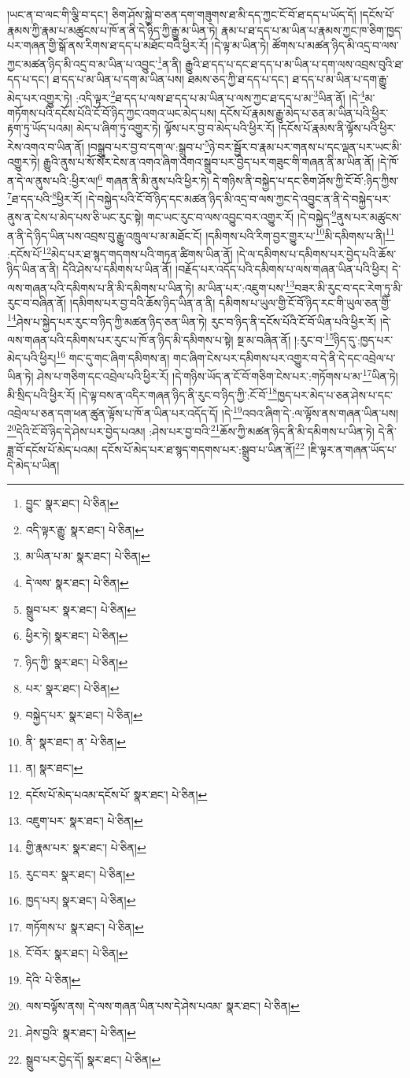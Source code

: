 །ཡང་ན་བ་ལང་གི་ལྕི་བ་དང་། ཅིག་ཤོས་སྐྱེ་བ་ཅན་དག་གཟུགས་ཐ་མི་དད་ཀྱང་ངོ་བོ་ཐ་དད་པ་ཡོད་དོ། །དངོས་པོ་རྣམས་ཀྱི་རྣམ་པ་མཚུངས་པ་ཁོ་ན་ནི་དེ་ཉིད་ཀྱི་རྒྱུ་མ་ཡིན་ཏེ། རྣམ་པ་ཐ་དད་པ་མ་ཡིན་པ་རྣམས་ཀྱང་ཁ་ཅིག་ཁྱད་པར་གཞན་གྱི་སྒོ་ནས་རིགས་ཐ་དད་པ་མཐོང་བའི་ཕྱིར་རོ། །དེ་ལྟ་མ་ཡིན་ཏེ། ཚོགས་པ་མཚན་ཉིད་མི་འདྲ་བ་ལས་ཀྱང་མཚན་ཉིད་མི་འདྲ་བ་མ་ཡིན་པ་འབྱུང་\footnote{བྱུང་  སྣར་ཐང་།  པེ་ཅིན། }ན་ནི། རྒྱུའི་ཐ་དད་པ་དང་ཐ་དད་པ་མ་ཡིན་པ་དག་ལས་འབྲས་བུའི་ཐ་དད་པ་དང་། ཐ་དད་པ་མ་ཡིན་པ་དག་མ་ཡིན་པས། ཐམས་ཅད་ཀྱི་ཐ་དད་པ་དང་། ཐ་དད་པ་མ་ཡིན་པ་དག་རྒྱུ་མེད་པར་འགྱུར་ཏེ། :འདི་ལྟར་\footnote{འདི་ལྟར་རྒྱུ་  སྣར་ཐང་།  པེ་ཅིན། }ཐ་དད་པ་ལས་ཐ་དད་པ་མ་ཡིན་པ་ལས་ཀྱང་ཐ་དད་པ་མ་\footnote{མ་ཡིན་པ་མ་  སྣར་ཐང་།  པེ་ཅིན། }ཡིན་ནོ། །དེ་\footnote{དེ་ལས་  སྣར་ཐང་།  པེ་ཅིན། }མ་གཏོགས་པའི་དངོས་པོའི་ངོ་བོ་ཉིད་ཀྱང་འགའ་ཡང་མེད་པས། དངོས་པོ་རྣམས་རྒྱུ་མེད་པ་ཅན་མ་ཡིན་པའི་ཕྱིར་རྟག་ཏུ་ཡོད་པའམ། མེད་པ་ཞིག་ཏུ་འགྱུར་ཏེ། ལྟོས་པར་བྱ་བ་མེད་པའི་ཕྱིར་རོ། །དངོས་པོ་རྣམས་ནི་ལྟོས་པའི་ཕྱིར་རེས་འགའ་བ་ཡིན་ནོ། །བསྒྲུབ་པར་བྱ་བ་དག་ལ་:སྒྲུབ་པ་\footnote{སྒྲུབ་པར་  སྣར་ཐང་།  པེ་ཅིན། }ཉེ་བར་སྦྱོར་བ་རྣམ་པར་གནས་པ་དང་ལྡན་པར་ཡང་མི་འགྱུར་ཏེ། རྒྱུའི་ནུས་པ་སོ་སོར་ངེས་ན་འགའ་ཞིག་འགའ་སྒྲུབ་པར་བྱེད་པར་གཟུང་གི་གཞན་ནི་མ་ཡིན་ནོ། །དེ་ཁོ་ན་དེ་ལ་ནུས་པའི་:ཕྱིར་ལ།\footnote{ཕྱིར་ཏེ།  སྣར་ཐང་།  པེ་ཅིན། } གཞན་ནི་མི་ནུས་པའི་ཕྱིར་ཏེ། དེ་གཉིས་ནི་བསྐྱེད་པ་དང་ཅིག་ཤོས་ཀྱི་ངོ་བོ་:ཉིད་ཀྱིས་\footnote{ཉིད་ཀྱི་  སྣར་ཐང་།  པེ་ཅིན། }ཐ་དད་པའི་\footnote{པར་  སྣར་ཐང་།  པེ་ཅིན། }ཕྱིར་རོ། །དེ་བསྐྱེད་པའི་ངོ་བོ་ཉིད་དང་མཚན་ཉིད་མི་འདྲ་བ་ལས་ཀྱང་དེ་འབྱུང་ན་ནི་དེ་བསྐྱེད་པར་ནུས་ན་ངེས་པ་མེད་པས་ཅི་ཡང་རུང་སྟེ། གང་ཡང་རུང་བ་ལས་འབྱུང་བར་འགྱུར་རོ། །དེ་བསྐྱེད་\footnote{བསྐྱེད་པར་  སྣར་ཐང་།  པེ་ཅིན། }ནུས་པར་མཚུངས་ན་ནི་དེ་ཉིད་ཡིན་པས་འབྲས་བུ་རྒྱུ་འཁྲུལ་པ་མ་མཐོང་ངོ། །དམིགས་པའི་རིག་བྱར་གྱུར་པ་\footnote{ནི་  སྣར་ཐང་། ན་  པེ་ཅིན། }མི་དམིགས་པ་ནི།\footnote{ན།  སྣར་ཐང་། } :དངོས་པོ་\footnote{དངོས་པོ་མེད་པའམ་དངོས་པོ་  སྣར་ཐང་།  པེ་ཅིན། }མེད་པར་ཐ་སྙད་གདགས་པའི་གཏན་ཚིགས་ཡིན་ནོ། །དེ་ལ་དམིགས་པ་དམིགས་པར་བྱེད་པའི་ཆོས་ཉིད་ཡིན་ན་ནི། དེའི་ཤེས་པ་དམིགས་པ་ཡིན་ནོ། །བརྗོད་པར་འདོད་པའི་དམིགས་པ་ལས་གཞན་ཡིན་པའི་ཕྱིར། དེ་ལས་གཞན་པའི་དམིགས་པ་ནི་མི་དམིགས་པ་ཡིན་ཏེ། མ་ཡིན་པར་:འཇུག་པས་\footnote{འཇུག་པར་  སྣར་ཐང་།  པེ་ཅིན། }བཟར་མི་རུང་བ་དང་རེག་ཏུ་མི་རུང་བ་བཞིན་ནོ། །དམིགས་པར་བྱ་བའི་ཆོས་ཉིད་ཡིན་ན་ནི། དམིགས་པ་ཡུལ་གྱི་ངོ་བོ་ཉིད་རང་གི་ཡུལ་ཅན་གྱི་\footnote{གྱི་རྣམ་པར་  སྣར་ཐང་།  པེ་ཅིན། }ཤེས་པ་སྐྱེད་པར་རུང་བ་ཉིད་ཀྱི་མཚན་ཉིད་ཅན་ཡིན་ཏེ། རུང་བ་ཉིད་ནི་དངོས་པོའི་ངོ་བོ་ཡིན་པའི་ཕྱིར་རོ། །དེ་ལས་གཞན་པའི་དམིགས་པར་རུང་པ་ཁོ་ན་ཉིད་མི་དམིགས་པ་སྟེ། སྔ་མ་བཞིན་ནོ། །:རུང་བ་\footnote{རུང་བར་  སྣར་ཐང་།  པེ་ཅིན། }ཉིད་དུ་:ཁྱད་པར་མེད་པའི་ཕྱིར།\footnote{ཁྱད་པར།  སྣར་ཐང་།  པེ་ཅིན། } གང་དུ་གང་ཞིག་དམིགས་ན། གང་ཞིག་ངེས་པར་དམིགས་པར་འགྱུར་བ་དེ་ནི་དེ་དང་འབྲེལ་པ་ཡིན་ཏེ། ཤེས་པ་གཅིག་དང་འབྲེལ་པའི་ཕྱིར་རོ། །དེ་གཉིས་ཡོད་ན་ངོ་བོ་གཅིག་ངེས་པར་:གཏོགས་པ་མ་\footnote{གཏོགས་པ་  སྣར་ཐང་།  པེ་ཅིན། }ཡིན་ཏེ། མི་སྲིད་པའི་ཕྱིར་རོ། །དེ་ལྟ་བས་ན་འདིར་གཞན་ཉིད་ནི་རུང་བ་ཉིད་ཀྱི་:ངོ་བོ་\footnote{ངོ་བོར་  སྣར་ཐང་།  པེ་ཅིན། }ཁྱད་པར་མེད་པ་ཅན་ཤེས་པ་དང་འབྲེལ་པ་ཅན་དག་ཕན་ཚུན་ལྟོས་པ་ཁོ་ན་ཡིན་པར་འདོད་དོ། །དེ་\footnote{དེའི་  པེ་ཅིན། }འབའ་ཞིག་དེ་:ལ་ལྟོས་ནས་གཞན་ཡིན་པས། \footnote{ལས་བལྟོས་ནས། དེ་ལས་གཞན་ཡིན་པས་དེ་ཤེས་པའམ་  སྣར་ཐང་།  པེ་ཅིན། }དེའི་ངོ་བོ་ཉིད་དེ་ཤེས་པར་བྱེད་པའམ། :ཤེས་པར་བྱ་བའི་\footnote{ཤེས་བྱའི་  སྣར་ཐང་།  པེ་ཅིན། }ཆོས་ཀྱི་མཚན་ཉིད་ནི་མི་དམིགས་པ་ཡིན་ཏེ། དེ་ནི་ཟླ་བོ་དངོས་པོ་མེད་པའམ། དངོས་པོ་མེད་པར་ཐ་སྙད་གདགས་པར་:སྒྲུབ་པ་ཡིན་ནོ།\footnote{སྒྲུབ་པར་བྱེད་དོ།  སྣར་ཐང་།  པེ་ཅིན། } །ཇི་ལྟར་ན་གཞན་ཡོད་པ་དེ་མེད་པ་ཡིན། 
